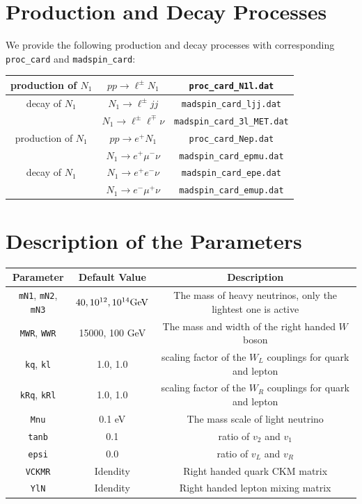 \documentclass[12pt]{article}
\begin{document}
\section{Production and Decay Processes}
We provide the following production and decay processes with corresponding \texttt{proc\_card} and \texttt{madspin\_card}:
\begin{center}
\begin{tabular}{c |c c}
    \hline
    \hline
    production of $N_1$& $p p \to \ell^{\pm} N_1$& \texttt{proc\_card\_N1l.dat}\\
    \hline
    decay of $N_1$& $N_1\to \ell^{\pm} j j$& \texttt{madspin\_card\_ljj.dat}\\
    & $N_1\to \ell^{\pm}\ell^{\mp}\nu$ & \texttt{madspin\_card\_3l\_MET.dat}\\
    \hline
    \hline
     production of $N_1$& $p p \to e^{+} N_1$& \texttt{proc\_card\_Nep.dat}\\
    \hline
    & $N_1\to e^+ \mu^- \nu $& \texttt{madspin\_card\_epmu.dat}\\
    decay of $N_1$& $N_1\to e^+ e^- \nu$ & \texttt{madspin\_card\_epe.dat}\\
    & $N_1\to e^- \mu^+ \nu$ & \texttt{madspin\_card\_emup.dat}\\
    \hline
    \hline
\end{tabular}
\end{center}


\section{Description of the Parameters}
\begin{center}
\begin{tabular}{c |c| c}
    \hline
    Parameter& Default Value& Description \\
    \hline
    \texttt{mN1}, \texttt{mN2}, \texttt{mN3}& $40,10^{12},10^{14} {\rm GeV}$ & The mass of heavy neutrinos, only the lightest one is active \\
    \hline
    \texttt{MWR}, \texttt{WWR} & 15000, 100 {\rm GeV} & The mass and width of the right handed $W$ boson \\
    \hline
    \texttt{kq}, \texttt{kl}& 1.0, 1.0& scaling factor of the $W_L$ couplings for quark and lepton\\
    \hline 
    \texttt{kRq}, \texttt{kRl}& 1.0, 1.0& scaling factor of the $W_R$ couplings for quark and lepton\\
    \hline
    \texttt{Mnu} & 0.1 {\rm eV}& The mass scale of light neutrino\\
    \hline
     \texttt{tanb} & 0.1 & ratio of $v_2$ and $v_1$\\
    \hline
     \texttt{epsi} & 0.0 & ratio of $v_L$ and $v_R$\\
    \hline
    \texttt{VCKMR} &Idendity& Right handed quark CKM matrix\\
    \hline
    \texttt{YlN} &Idendity& Right handed lepton mixing matrix\\
    \hline
\end{tabular}
\end{center}
\end{document}
